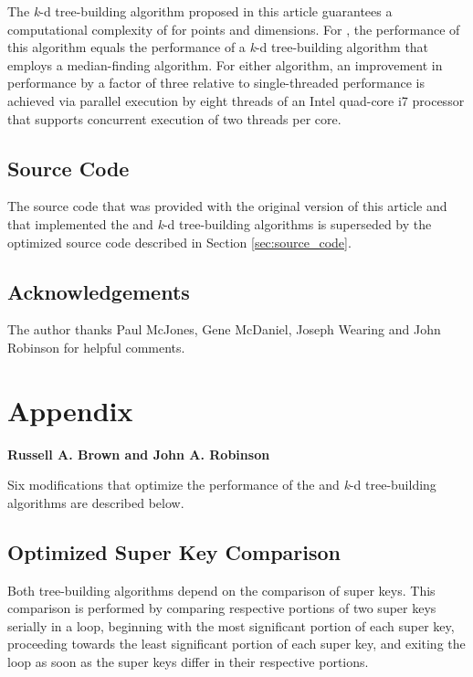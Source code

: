 \documentclass{sig-alternate}
\begin{document}
The \emph{k}-d tree-building algorithm proposed in this article guarantees a computational complexity of  for  points and  dimensions.  For , the performance of this algorithm equals the performance of a  \emph{k}-d tree-building algorithm that employs a  median-finding algorithm.  For either algorithm, an improvement in performance by a factor of three relative to single-threaded performance is achieved via parallel execution by eight threads of an Intel quad-core i7 processor that supports concurrent execution of two threads per core.

\subsection*{Source Code}

 The source code that was provided with the original version of this article \cite{Brown} and that implemented the  and  \emph{k}-d tree-building algorithms is superseded by the optimized source code described in Section \ref{sec:source_code}.

\subsection*{Acknowledgements}

The author thanks Paul McJones, Gene McDaniel, Joseph Wearing and John Robinson for helpful comments.

\section{Appendix}
\label{sec:appendix}

\hfill \break \textbf{Russell A. Brown and John A. Robinson} \hfill \break

Six modifications that optimize the performance of the  and  \emph{k}-d tree-building algorithms are described below.

\subsection{Optimized Super Key Comparison}

Both tree-building algorithms depend on the comparison of super keys. This comparison is performed by comparing respective portions of two super keys serially in a loop, beginning with the most significant portion of each super key, proceeding towards the least significant portion of each super key, and exiting the loop as soon as the super keys differ in their respective portions. 
\end{document}
